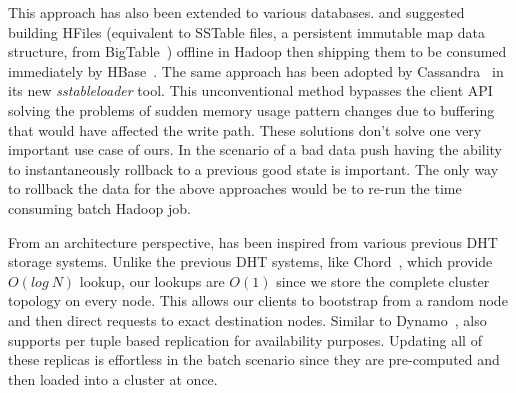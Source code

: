 This approach has also been extended to various databases. \citet{konstantinou}
and \citet{barbuzzi} suggested building HFiles (equivalent to SSTable files, a
persistent immutable map data structure, from BigTable~\cite{bigtable}) offline
in Hadoop then shipping them to be consumed immediately by HBase~\cite{hadoop}.
The same approach has been adopted by Cassandra~\cite{cassandra} in its new
\emph{sstableloader} tool. This unconventional method bypasses the client API 
solving the problems of sudden memory usage pattern changes due to buffering 
that would have affected the write path. These solutions don't solve one very 
important use case of ours. In the scenario of a bad data push having the ability 
to instantaneously rollback to a previous good state is important. The only 
way to rollback the data for the above approaches would be to re-run the time 
consuming batch Hadoop job.

From an architecture perspective, \projectname{} has been inspired from various
previous DHT storage systems. Unlike the previous DHT systems, like
Chord~\cite{chord}, which provide $O(log~N)$ lookup, our lookups are $O(1)$
since we store the complete cluster topology on every node. This allows our
clients to bootstrap from a random node and then direct requests to exact
destination nodes. Similar to Dynamo~\cite{dynamo}, \projectname{} also
supports per tuple based replication for availability purposes. Updating all of
these replicas is effortless in the batch scenario since they are pre-computed
and then loaded into a \projectname{} cluster at once. 

